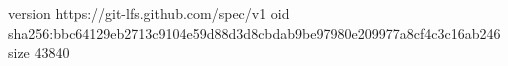 version https://git-lfs.github.com/spec/v1
oid sha256:bbc64129eb2713c9104e59d88d3d8cbdab9be97980e209977a8cf4c3c16ab246
size 43840
